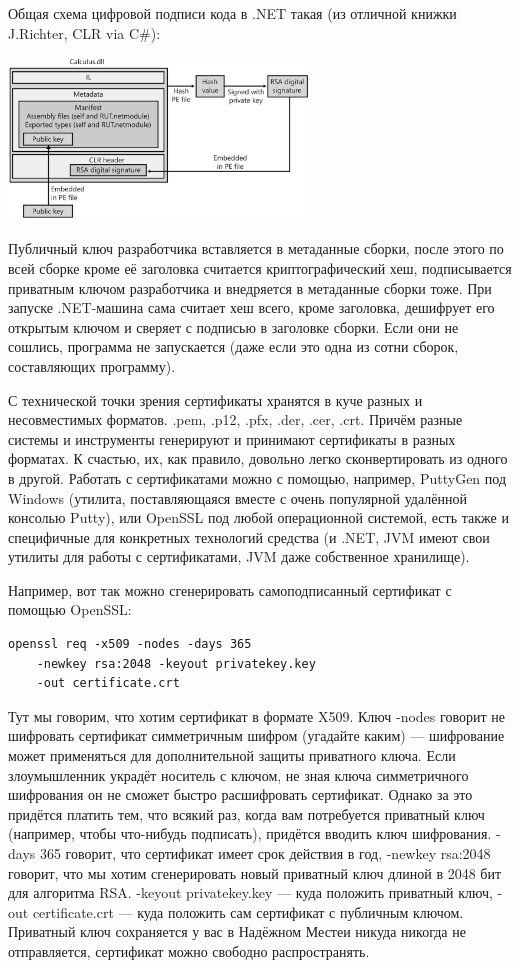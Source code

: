 \documentclass{../mcstext}
\begin{document}
Общая схема цифровой подписи кода в .NET такая (из отличной книжки J.Richter, CLR via C\#):

\begin{center}
    \includegraphics[width=0.6\textwidth]{dotNetCodeSigning.png}
\end{center}

Публичный ключ разработчика вставляется в метаданные сборки, после этого по всей сборке кроме её заголовка считается криптографический хеш, подписывается приватным ключом разработчика и внедряется в метаданные сборки тоже. При запуске .NET-машина сама считает хеш всего, кроме заголовка, дешифрует его открытым ключом и сверяет с подписью в заголовке сборки. Если они не сошлись, программа не запускается (даже если это одна из сотни сборок, составляющих программу).

С технической точки зрения сертификаты хранятся в куче разных и несовместимых форматов. .pem, .p12, .pfx, .der, .cer, .crt. Причём разные системы и инструменты генерируют и принимают сертификаты в разных форматах. К счастью, их, как правило, довольно легко сконвертировать из одного в другой. Работать с сертификатами можно с помощью, например, PuttyGen под Windows (утилита, поставляющаяся вместе с очень популярной удалённой консолью Putty), или OpenSSL под любой операционной системой, есть также и специфичные для конкретных технологий средства (и .NET, JVM имеют свои утилиты для работы с сертификатами, JVM даже собственное хранилище).

Например, вот так можно сгенерировать самоподписанный сертификат с помощью OpenSSL:

\begin{verbatim}
openssl req -x509 -nodes -days 365 
    -newkey rsa:2048 -keyout privatekey.key 
    -out certificate.crt
\end{verbatim}

Тут мы говорим, что хотим сертификат в формате X509. Ключ -nodes говорит не шифровать сертификат симметричным шифром (угадайте каким) --- шифрование может применяться для дополнительной защиты приватного ключа. Если злоумышленник украдёт носитель с ключом, не зная ключа симметричного шифрования он не сможет быстро расшифровать сертификат. Однако за это придётся платить тем, что всякий раз, когда вам потребуется приватный ключ (например, чтобы что-нибудь подписать), придётся вводить ключ шифрования. -days 365 говорит, что сертификат имеет срок действия в год, -newkey rsa:2048 говорит, что мы хотим сгенерировать новый приватный ключ длиной в 2048 бит для алгоритма RSA. -keyout privatekey.key --- куда положить приватный ключ, -out certificate.crt --- куда положить сам сертификат с публичным ключом. Приватный ключ сохраняется у вас в Надёжном Месте\texttrademark и никуда никогда не отправляется, сертификат можно свободно распространять.
\end{document}
